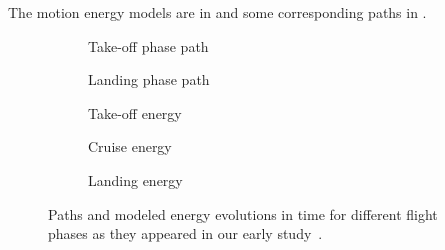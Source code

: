 The motion energy models are in  and some corresponding paths in .
\begin{figure}[h!]
  \centering
  \selectfont
  \footnotesize
  \begin{subfigure}[c]{0.475\textwidth}
    \centering
    
    \caption{Take-off phase path}
    \label{fig:takeoff-path}
    \vspace{1.4ex}
  \end{subfigure}
  \begin{subfigure}[c]{0.475\textwidth}
    \centering
    
    \vspace*{3ex}
    \caption{Landing phase path}
    \label{fig:landing-path}
    \vspace{1.4ex}
  \end{subfigure}
  \quad
  \begin{subfigure}[t]{0.35\textwidth}
    \centering
    
    \caption{Take-off energy}
    \label{fig:takeoff-energy}
  \end{subfigure}
  \begin{subfigure}[t]{0.31\textwidth}
    \centering
    
    \caption{Cruise energy}
    \label{fig:cruise-energy-fourier}
  \end{subfigure}
  \begin{subfigure}[t]{0.30\textwidth}
    \centering
    
    \caption{Landing energy}
    \label{fig:landing-energy}
  \end{subfigure}
  \caption[Paths and modeled energy evolutions in time for different flight phases]{Paths and modeled energy evolutions in time for different flight phases as they appeared in our early study~\citep{seewald2020mechanical}.}
  \label{fig:path-energy}
\end{figure}
